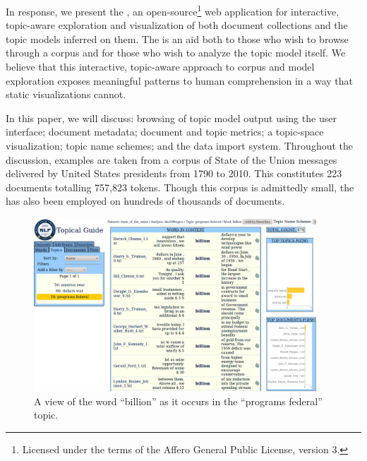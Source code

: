 \documentclass[11pt]{article}
\newcommand{\comments}[1]{}
\begin{document}
In response, we present the \tool, an open-source\footnote{Licensed under the terms of the Affero
General Public License, version 3.} web application for interactive,
topic-aware exploration and visualization of both document collections and the
topic models inferred on them.\comments{\footnote{Further information on the project, including %
source code access and a live demonstration server, can be found
at \texttt{\projecturl}.}} The \tool{} is an aid both to those who wish to
browse through a corpus and for those who wish to analyze the topic model itself.
We believe that this interactive, topic-aware approach to corpus and model exploration
exposes meaningful patterns to human comprehension in a way that static visualizations cannot.

In this paper, we will discuss: browsing of topic model output using the \tool{} user interface\comments{, as in \newcite{gardner_browser_2010}}; %
document metadata; document and topic metrics; a topic-space visualization;
topic name schemes; and the data import
system. Throughout the discussion, examples are taken from a
corpus of State of the Union messages delivered by United States presidents
from 1790 to 2010. This constitutes 223 documents totalling 757,823 tokens.
Though this corpus is admittedly small, the \tool{} has also been employed
on hundreds of thousands of documents. %

\begin{figure}[t]
 \centering
 \includegraphics[width=400px,keepaspectratio=true]{./topic_word_view2.png}
 \caption{A view of the word ``billion'' as it occurs in the ``programs federal'' topic.}
 \label{fig:topic_word}
\end{figure}
\end{document}
